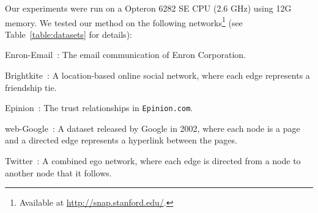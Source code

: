 Our experiments were run on a Opteron 6282 SE CPU (2.6 GHz) using 12G memory. We tested our method on the following networks\footnote{Available at \url{http://snap.stanford.edu/}.} (see Table~\ref{table:datasets} for details): 
\begin{itemize*}
 \item Enron-Email~\cite{klimt2004introducing}: The email communication of Enron Corporation.
 \item Brightkite~\cite{ChoML11}: A location-based online social network, where each edge represents a friendship tie.
 \item Epinion~\cite{richardson2003trust}: The trust relationships in \texttt{Epinion.com}.
 \item web-Google~\cite{webgoogle}: A dataset released by Google in 2002, where each node is a page and a directed edge represents a hyperlink between the pages.
 \item Twitter~\cite{McAuleyL12}: A combined ego network, where each edge is directed from a node to another node that it follows. 
\end{itemize*}




